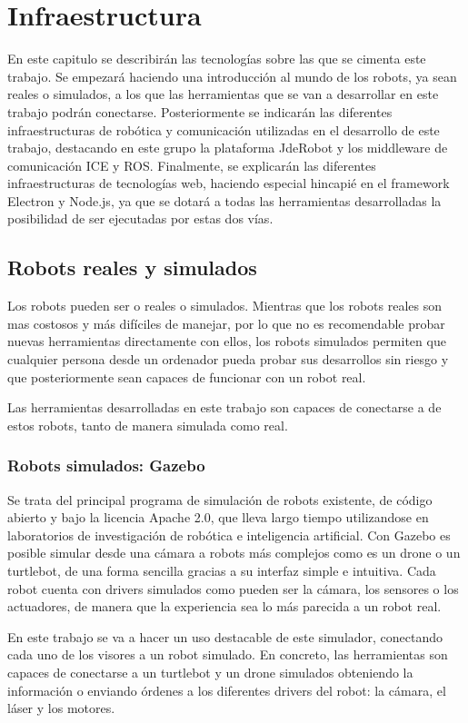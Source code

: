 \chapter{Infraestructura}\label{cap.infraestructura}
En este capitulo se describirán las tecnologías sobre las que se cimenta este trabajo. Se empezará haciendo una introducción al mundo de los robots, ya sean reales o simulados, a los que las herramientas que se van a desarrollar en este trabajo podrán conectarse. Posteriormente se indicarán las diferentes infraestructuras de robótica y comunicación utilizadas en el desarrollo de este trabajo, destacando en este grupo la plataforma JdeRobot y los middleware de comunicación ICE y ROS. Finalmente, se explicarán las diferentes infraestructuras de tecnologías web, haciendo especial hincapié en el framework Electron y Node.js, ya que se dotará a todas las herramientas desarrolladas la posibilidad de ser ejecutadas por estas dos vías.

\section{Robots reales y simulados}
Los robots pueden ser o reales o simulados. Mientras que los robots reales son mas costosos y más difíciles de manejar, por lo que no es recomendable probar nuevas herramientas directamente con ellos, los robots simulados permiten que cualquier persona desde un ordenador pueda probar sus desarrollos sin riesgo y que posteriormente sean capaces de funcionar con un robot real.

Las herramientas desarrolladas en este trabajo son capaces de conectarse a de estos robots, tanto de manera simulada como real.

\subsection{Robots simulados: Gazebo}
Se trata del principal programa de simulación de robots existente, de código abierto y bajo la licencia Apache 2.0, que lleva largo tiempo utilizandose en laboratorios de investigación de robótica e inteligencia artificial. Con Gazebo es posible simular desde una cámara a robots más complejos como es un drone o un turtlebot, de una forma sencilla gracias a su interfaz simple e intuitiva. Cada robot cuenta con drivers simulados como pueden ser la cámara, los sensores o los actuadores, de manera que la experiencia sea lo más parecida a un robot real.

En este trabajo se va a hacer un uso destacable de este simulador, conectando cada uno de los visores a un robot simulado. En concreto, las herramientas son capaces de conectarse a un turtlebot y un drone simulados obteniendo la información o enviando órdenes a los diferentes drivers del robot: la cámara, el láser y los motores.

